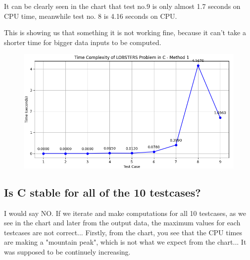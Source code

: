 \documentclass{article}%
\begin{document}
                        
    It can be clearly seen in the chart that test no.9 is only almost 1.7 seconds on CPU time, meanwhile test no. 8 is 4.16 seconds on CPU.
    
                        
    This is showing us that something it is not working fine, because it can't take a shorter time for bigger data inputs to be computed.
\vspace{0.2cm}
    \vspace*{\fill}



\begin{figure}[h!]%
\centering%
\includegraphics[width=\textwidth]{time_complexity_c_1.png}%
\end{figure}

%
\newpage%

    
    \vspace*{\fill}

    \subsection{Is C stable for all of the 10 testcases?}
                        
    \vspace{1cm}
    
    I would say NO. If we iterate and make computations for all 10 testcases, as we see in the chart and later from the output data, 
    the maximum values for each testcases are not correct... Firstly, from the chart, you see that the CPU times are making a "mountain peak",
    which is not what we expect from the chart... It was supposed to be continuely increasing.
   \vspace{0.2cm}
    \vspace*{\fill}    

\end{document}

